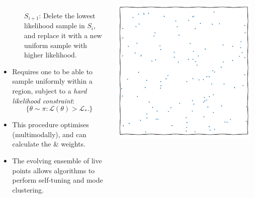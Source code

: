 \documentclass[aspectratio=169]{beamer}
\begin{document}
\begin{frame}
\begin{columns}
\begin{itemize}
\begin{itemize}
                    \item[$S_{i+1}$:] Delete the lowest likelihood sample in $S_{i}$, and replace it with a new uniform sample with higher likelihood.
                \end{itemize}
            \item Requires one to be able to sample uniformly within a region, subject to a {\em hard likelihood constraint}:
                \[\{\theta\sim \pi : \mathcal{L}(\theta)>\mathcal{L}_*. \}\]
            \item This procedure optimises (multimodally), and can calculate the  \&  weights.
            \item The evolving ensemble of live points allows algorithms to perform self-tuning and mode clustering.
        \end{itemize}
        \includegraphics[width=\textwidth,page=4]{figures/himmelblau}%
    \end{columns}
\end{frame}
\end{document}

